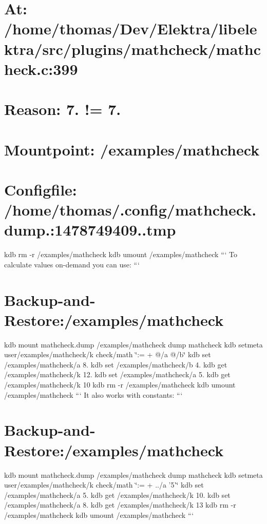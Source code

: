 \section*{At\+: /home/thomas/\+Dev/\+Elektra/libelektra/src/plugins/mathcheck/mathcheck.c\+:399}

\section*{Reason\+: 7. != 7.}

\section*{Mountpoint\+: /examples/mathcheck}

\section*{Configfile\+: /home/thomas/.config/mathcheck.\+dump.\+:1478749409..\+tmp}

kdb rm -\/r /examples/mathcheck kdb umount /examples/mathcheck ``` To calculate values on-\/demand you can use\+: ``` \section*{Backup-\/and-\/\+Restore\+:/examples/mathcheck}

kdb mount mathcheck.\+dump /examples/mathcheck dump mathcheck kdb setmeta user/examples/mathcheck/k check/math \char`\"{}\+:= + @/a @/b\char`\"{} kdb set /examples/mathcheck/a 8. kdb set /examples/mathcheck/b 4. kdb get /examples/mathcheck/k 12. kdb set /examples/mathcheck/a 5. kdb get /examples/mathcheck/k 10 kdb rm -\/r /examples/mathcheck kdb umount /examples/mathcheck ``` It also works with constants\+: ``` \section*{Backup-\/and-\/\+Restore\+:/examples/mathcheck}

kdb mount mathcheck.\+dump /examples/mathcheck dump mathcheck kdb setmeta user/examples/mathcheck/k check/math \char`\"{}\+:= + ../a '5'\char`\"{} kdb set /examples/mathcheck/a 5. kdb get /examples/mathcheck/k 10. kdb set /examples/mathcheck/a 8. kdb get /examples/mathcheck/k 13 kdb rm -\/r /examples/mathcheck kdb umount /examples/mathcheck ``` 